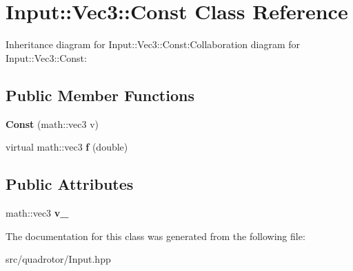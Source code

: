 \hypertarget{classInput_1_1Vec3_1_1Const}{
\section{Input::Vec3::Const Class Reference}
\label{classInput_1_1Vec3_1_1Const}
}
Inheritance diagram for Input::Vec3::Const:Collaboration diagram for Input::Vec3::Const:\subsection*{Public Member Functions}
\begin{DoxyCompactItemize}
\item 
\hypertarget{classInput_1_1Vec3_1_1Const_ac7ec7f1798a13524dac263d63660ee64}{
{\bfseries Const} (math::vec3 v)}
\label{classInput_1_1Vec3_1_1Const_ac7ec7f1798a13524dac263d63660ee64}

\item 
\hypertarget{classInput_1_1Vec3_1_1Const_ad2fdc41feb2afc22fbc7bda5fae71fba}{
virtual math::vec3 {\bfseries f} (double)}
\label{classInput_1_1Vec3_1_1Const_ad2fdc41feb2afc22fbc7bda5fae71fba}

\end{DoxyCompactItemize}
\subsection*{Public Attributes}
\begin{DoxyCompactItemize}
\item 
\hypertarget{classInput_1_1Vec3_1_1Const_a3fa537d473ff297a1581031e0ba593b4}{
math::vec3 {\bfseries v\_\-}}
\label{classInput_1_1Vec3_1_1Const_a3fa537d473ff297a1581031e0ba593b4}

\end{DoxyCompactItemize}


The documentation for this class was generated from the following file:\begin{DoxyCompactItemize}
\item 
src/quadrotor/Input.hpp\end{DoxyCompactItemize}
